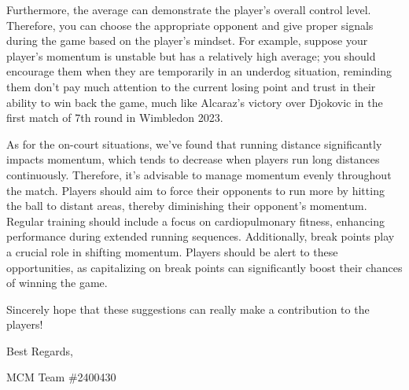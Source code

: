 \documentclass{mcmthesis}
\begin{document}
\begin{appendices}
\begin{memo}[Memorandum]
Furthermore, the average can demonstrate the player's overall control level. Therefore, you can choose the appropriate opponent and give proper signals during the game based on the player's mindset. For example, suppose your player's momentum is unstable but has a relatively high average; you should encourage them when they are temporarily in an underdog situation, reminding them don't pay much attention to the current losing point and trust in their ability to win back the game, much like Alcaraz's victory over Djokovic in the first match of 7th round in Wimbledon 2023.

As for the on-court situations, we've found that running distance significantly impacts momentum, which tends to decrease when players run long distances continuously. Therefore, it's advisable to manage momentum evenly throughout the match. Players should aim to force their opponents to run more by hitting the ball to distant areas, thereby diminishing their opponent's momentum. Regular training should include a focus on cardiopulmonary fitness, enhancing performance during extended running sequences. Additionally, break points play a crucial role in shifting momentum. Players should be alert to these opportunities, as capitalizing on break points can significantly boost their chances of winning the game.

Sincerely hope that these suggestions can really make a contribution to the players!

Best Regards,

MCM Team \#2400430

\end{memo}

\end{appendices}


\AImatter
\end{document}
